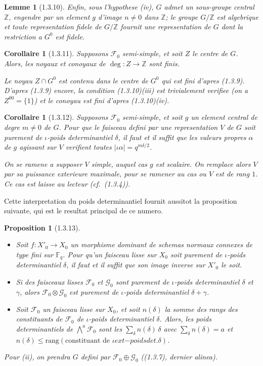 \documentclass[12pt,a4paper]{article}
\theoremstyle{plain}
\newtheorem{lemme}[theorem]{Lemme}
\newtheorem{proposition}[theorem]{Proposition}
\newtheorem{corollaire}[theorem]{Corollaire}
\theoremstyle{definition}
\theoremstyle{definition}
\theoremstyle{remark}
\begin{document}
\begin{lemme}[1.3.10]
Enfin, sous l'hypothese (iv), $G$ admet un sous-groupe central $\mathbb{Z}$, engendre par un element $g$ d'image $n \neq 0$ dans $\mathbb{Z}$; le groupe $G/\mathbb{Z}$ est algebrique et toute representation fidele de $G/\mathbb{Z}$ fournit une representation de $G$ dont la restriction a $G^0$ est fidele.
\end{lemme}

\begin{corollaire}[1.3.11]
Supposons $\mathscr{F}_0$ semi-simple, et soit $Z$ le centre de $G$. Alors, les noyaux et conoyaux de $\deg : Z \to \mathbb{Z}$ sont finis.

Le noyau $Z \cap G^0$ est contenu dans le centre de $G^0$ qui est fini d'apres (1.3.9). D'apres (1.3.9) encore, la condition (1.3.10)(iii) est trivialement verifiee (on a $Z^{00} = \{1\}$) et le conoyau est fini d'apres (1.3.10)(iv).
\end{corollaire}

\begin{corollaire}[1.3.12]
Supposons $\mathscr{F}_0$ semi-simple, et soit $g$ un element central de degre $m \neq 0$ de $G$. Pour que le faisceau defini par une representation $V$ de $G$ soit purement de $\iota$-poids determinantiel $\delta$, il faut et il suffit que les valeurs propres $\alpha$ de $g$ agissant sur $V$ verifient toutes $|\iota\alpha| = q^{m\delta/2}$.

On se ramene a supposer $V$ simple, auquel cas $g$ est scalaire. On remplace alors $V$ par sa puissance exterieure maximale, pour se ramener au cas ou $V$ est de rang $1$. Ce cas est laisse au lecteur (cf.~(1.3.4)).
\end{corollaire}

Cette interpretation du poids determinantiel fournit aussitot la proposition suivante, qui est le resultat principal de ce numero.

\begin{proposition}[1.3.13]
$\;$
\begin{itemize}[nosep]
\item[(i)] Soit $f: X'_0 \to X_0$ un morphisme dominant de schemas normaux connexes de type fini sur $\mathbb{F}_q$. Pour qu'un faisceau lisse sur $X_0$ soit purement de $\iota$-poids determinantiel $\delta$, il faut et il suffit que son image inverse sur $X'_0$ le soit.
\item[(ii)] Si des faisceaux lisses $\mathscr{F}_0$ et $\mathscr{G}_0$ sont purement de $\iota$-poids determinantiel $\delta$ et $\gamma$, alors $\mathscr{F}_0 \otimes \mathscr{G}_0$ est purement de $\iota$-poids determinantiel $\delta + \gamma$.
\item[(iii)] Soit $\mathscr{F}_0$ un faisceau lisse sur $X_0$, et soit $n(\delta)$ la somme des rangs des constituants de $\mathscr{F}_0$ de $\iota$-poids determinantiel $\delta$. Alors, les poids determinantiels de $\bigwedge^a \mathscr{F}_0$ sont les $\sum_\delta n(\delta)\,\delta$ avec $\sum_\delta n(\delta) = a$ et $n(\delta) \leq \text{rang}(\text{constituant de } \iota	ext{-poids det. } \delta)$.
\end{itemize}
Pour (ii), on prendra $G$ defini par $\mathscr{F}_0 \oplus \mathscr{G}_0$ ((1.3.7), dernier alinea).
\end{proposition}
\end{document}
